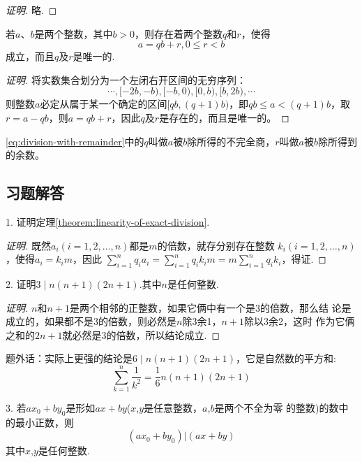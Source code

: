 \begin{proof}[证明]
  略.
\end{proof}

\begin{theorem}
  \label{theorem:division-with-remainder}
若$a$、$b$是两个整数，其中$b>0$，则存在着两个整数$q$和$r$，使得
\begin{equation}
  \label{eq:division-with-remainder}
  a=qb+r, 0 \leqslant r < b
\end{equation}
成立，而且$q$及$r$是唯一的.
\end{theorem}

\begin{proof}[证明]
  将实数集合划分为一个左闭右开区间的无穷序列：
\[ \cdots,[-2b,-b),[-b,0),[0,b),[b,2b),\cdots \]
则整数$a$必定从属于某一个确定的区间$[qb,(q+1)b)$，即$qb \leqslant a <(q+1)b$，取$r=a-qb$，则$a=qb+r$，因此$q$及$r$是存在的，而且是唯一的。
\end{proof}

\begin{definition}
  \label{def:incomplete-quotient-and-remainder}
\ref{eq:division-with-remainder}中的$q$叫做$a$被$b$除所得的不完全商，$r$叫做$a$被$b$除所得到的余数。
\end{definition}

\subsection*{习题解答}
1. 证明定理\ref{theorem:linearity-of-exact-division}.

\begin{proof}[证明]
既然$a_i(i=1,2,\dots,n)$都是$m$的倍数，就存分别存在整数
$k_i(i=1,2,\dots,n)$，使得$a_i=k_im$，因此
$\sum_{i=1}^nq_ia_i=\sum_{i=1}^nq_ik_im=m\sum_{i=1}^nq_ik_i$，得证.
\end{proof}

2. 证明$3 \mid n(n+1)(2n+1)$.其中$n$是任何整数.

\begin{proof}[证明]
$n$和$n+1$是两个相邻的正整数，如果它俩中有一个是3的倍数，那么结
论是成立的，如果都不是3的倍数，则必然是$n$除3余1，$n+1$除以3余2，这时
作为它俩之和的$2n+1$就必然是3的倍数，所以结论成立.
\end{proof}

题外话：实际上更强的结论是$6 \mid n(n+1)(2n+1)$，它是自然数的平方和:
\[ \sum_{k=1}^n\frac{1}{k^2}=\frac{1}{6}n(n+1)(2n+1) \]

3. 若$ax_0+by_0$是形如$ax+by$($x$,$y$是任意整数，$a$,$b$是两个不全为零
的整数)的数中的最小正数，则
\begin{displaymath}
  (ax_0+by_0)|(ax+by)
\end{displaymath}
其中$x$,$y$是任何整数.

